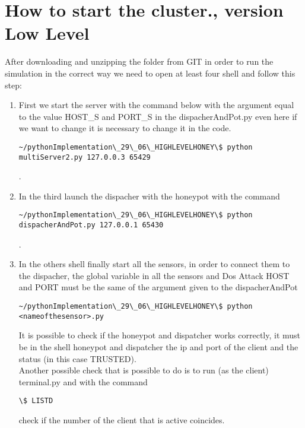 \section{How to start the cluster., version Low Level}
After downloading and unzipping the folder from GIT in order to run the simulation in the correct way we need to open at least four shell and follow this step:
\begin{enumerate}
\item First we start the server with the command below with the argument equal to the value HOST\_S and PORT\_S in the dispacherAndPot.py even here if we want to change 
it is necessary to change it in the code.  \begin{verbatim}~/pythonImplementation\_29\_06\_HIGHLEVELHONEY\$ python multiServer2.py 127.0.0.3 65429\end{verbatim}.
\item In the third launch the dispacher with the honeypot with the command  \begin{verbatim}~/pythonImplementation\_29\_06\_HIGHLEVELHONEY\$ python dispacherAndPot.py 127.0.0.1 65430\end{verbatim}. 
\item In the others shell finally start all the sensors, in order to connect them to the dispacher, the global variable in all the sensors and Dos Attack HOST and PORT must be the same of the argument given to the dispacherAndPot  \begin{verbatim}~/pythonImplementation\_29\_06\_HIGHLEVELHONEY\$ python <nameofthesensor>.py\end{verbatim}
It is possible to check if the honeypot and dispatcher works correctly, it must be in the shell honeypot and dispatcher the ip and port of the client and the status (in this case TRUSTED).\\
Another possible check that is possible to do is to run (as the client) terminal.py and with the command \begin{verbatim}\$ LISTD\end{verbatim} check if the number of the client that is active coincides.
\end{enumerate}
